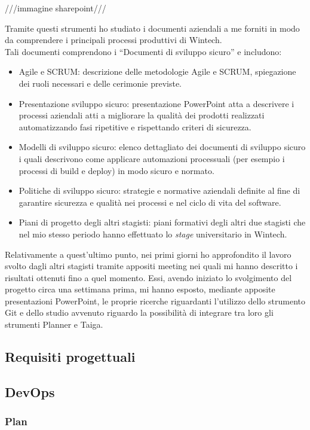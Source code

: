 ///immagine sharepoint/// 

Tramite questi strumenti ho studiato i documenti aziendali a me forniti in modo da comprendere i principali processi produttivi di Wintech.\\ 
Tali documenti comprendono i “Documenti di sviluppo sicuro” e includono:
\begin{itemize}
    \item Agile e SCRUM: descrizione delle metodologie Agile e SCRUM, spiegazione dei ruoli necessari e delle cerimonie previste. 
    \item Presentazione sviluppo sicuro: presentazione PowerPoint atta a descrivere i processi aziendali atti a migliorare la qualità dei prodotti realizzati automatizzando fasi ripetitive e rispettando criteri di sicurezza. 
    \item Modelli di sviluppo sicuro: elenco dettagliato dei documenti di sviluppo sicuro i quali descrivono come applicare automazioni processuali (per esempio i processi di build e deploy) in modo sicuro e normato. 
    \item Politiche di sviluppo sicuro: strategie e normative aziendali definite al fine di garantire sicurezza e qualità nei processi e nel ciclo di vita del software. 
    \item Piani di progetto degli altri stagisti: piani formativi degli altri due stagisti che nel mio stesso periodo hanno effettuato lo \emph{stage} universitario in Wintech. 
\end{itemize}
Relativamente a quest'ultimo punto, nei primi giorni ho approfondito il lavoro svolto dagli altri stagisti tramite appositi meeting nei quali mi hanno descritto i risultati ottenuti fino a quel momento. Essi, avendo iniziato lo svolgimento del progetto circa una settimana prima, mi hanno esposto, mediante apposite presentazioni PowerPoint, le proprie ricerche riguardanti l'utilizzo dello strumento Git e dello studio avvenuto riguardo la possibilità di integrare tra loro gli strumenti Planner e Taiga. 

\subsection{Requisiti progettuali}

\subsection{DevOps}
\subsubsection*{Plan}
